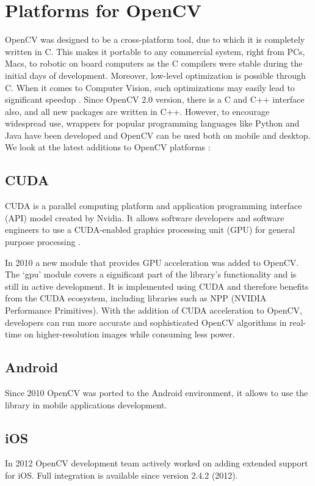 \documentclass[9pt,twocolumn,twoside]{../../styles/osajnl}
\begin{document}
\section{Platforms for OpenCV}
OpenCV was designed to be a cross-platform tool, due to which it is completely written in C. This makes it portable to any commercial system, right from PCs, Macs, to robotic on board computers as the C compilers were stable during the initial days of development. Moreover, low-level optimization is possible through C. When it comes to Computer Vision, such optimizations may easily lead to significant speedup \cite{www-platforms}. 
Since OpenCV 2.0 version, there is a C and C++ interface also, and all new packages are written in C++. However, to encourage widespread use, wrappers for popular programming languages like Python and Java have been developed and OpenCV can be used both on mobile and desktop. We look at the latest additions to OpenCV platforms \cite{www-platforms}:

\subsection{CUDA}
CUDA is a parallel computing platform and application programming interface (API) model created by Nvidia. It allows software developers and software engineers to use a CUDA-enabled graphics processing unit (GPU) for general purpose processing \cite{www-cuda-wiki}. 

In 2010 a new module that provides GPU acceleration was added to OpenCV. The ‘gpu’ module covers a significant part of the library’s functionality and is still in active development. It is implemented using CUDA and therefore benefits from the CUDA ecosystem, including libraries such as NPP (NVIDIA Performance Primitives). With the addition of CUDA acceleration to OpenCV, developers can run more accurate and sophisticated OpenCV algorithms in real-time on higher-resolution images while consuming less power.

\subsection{Android}
Since 2010 OpenCV was ported to the Android environment, it allows to use the library in mobile applications development.
\subsection{iOS}
In 2012 OpenCV development team actively worked on adding extended support for iOS. Full integration is available since version 2.4.2 (2012).
\end{document}
